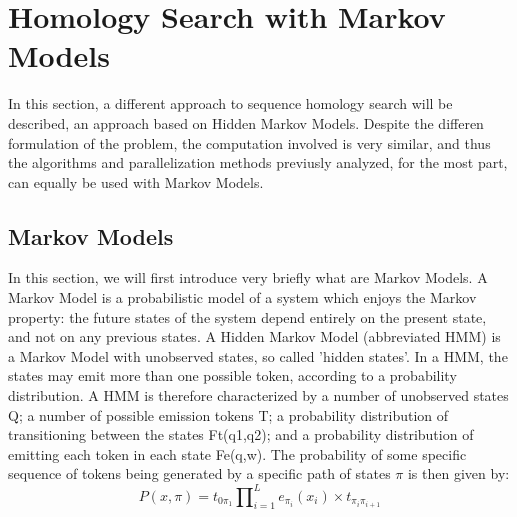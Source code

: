 \section{Homology Search with Markov Models}

In this section, a different approach to sequence homology search will be described, an approach based on Hidden Markov Models. Despite the differen formulation of the problem, the  computation involved is very similar, and thus the algorithms and parallelization methods previusly analyzed, for the most part, can equally be used with Markov Models. 


\subsection{Markov Models}

In this section,  we will first introduce very briefly what are Markov Models.
A Markov Model is a probabilistic model of a system which enjoys the Markov property: the future states of the system depend entirely on the present state, and not on any previous states. A Hidden Markov Model (abbreviated HMM) is a Markov Model with unobserved states, so called 'hidden states'. In a HMM, the states may emit more than one possible token, according to a probability distribution. A HMM is therefore characterized by a number of unobserved states Q; a number of possible emission tokens T; a probability distribution of transitioning between the states Ft(q1,q2); and a probability distribution of emitting each token in each state Fe(q,w). The probability of some specific sequence of tokens being generated by a specific path of states $\pi$ is then given by:
$$P(x,\pi) = t_{0\pi_1} \prod\nolimits_{i=1}^L e_{\pi_i}(x_i) \times t_{\pi_i \pi_{i+1} }  $$

